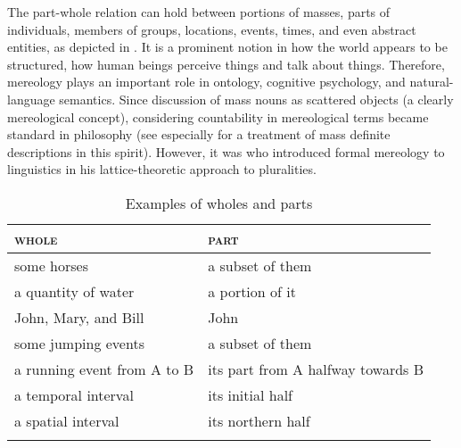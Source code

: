 The part-whole relation can hold between portions of masses, parts of individuals, members of groups, locations, events, times, and even abstract entities, as depicted in   \citep[see][]{simons1987parts,winston_chaffin_herrmann1987taxonomy}. It is a prominent notion in how the world appears to be structured, how human beings perceive things and talk about things. Therefore, mereology plays an important role in ontology, cognitive psychology, and natural-language semantics. Since  discussion of mass nouns as scattered objects (a clearly mereological concept), considering countability in mereological terms became standard in philosophy (see especially \citealt{sharvy1980more} for a treatment of mass definite descriptions in this spirit). However, it was \citet{link1983logical} who introduced formal mereology to linguistics in his lattice-theoretic approach to pluralities.\largerpage

\begin{table}[h!]
\centering
\begin{tabular}{ll}
\lsptoprule
\textsc{whole}   & \textsc{part}     \\ \midrule
some horses  & a subset of them          \\
a quantity of water & a portion of it         \\
John, Mary, and Bill         & John          \\
some jumping events       & a subset of them        \\
a running event from A to B         & its part from A halfway towards B  \\
a temporal interval & its initial half  \\
a spatial interval          & its northern half \\ \lspbottomrule
\end{tabular}
\caption{Examples of wholes and parts \citep[p. 12]{champollion2017parts}}
\label{tab:examples-wholes-part}
\end{table}

